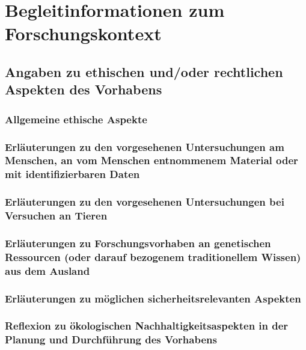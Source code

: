 \documentclass{scrartcl}
\begin{document}
\printbibliography[heading=none]

\clearpage
\renewcommand{\maxpage}{8}
\setcounter{page}{1}

\section{Begleitinformationen zum Forschungskontext}

\subsection{Angaben zu ethischen und/oder rechtlichen Aspekten des Vorhabens}

\subsubsection{Allgemeine ethische Aspekte}

\subsubsection{Erläuterungen zu den vorgesehenen Untersuchungen am Menschen, an vom Menschen entnommenem Material oder mit identifizierbaren Daten}

\subsubsection{Erläuterungen zu den vorgesehenen Untersuchungen bei Versuchen an Tieren}

\subsubsection{Erläuterungen zu Forschungsvorhaben an genetischen Ressourcen (oder darauf bezogenem traditionellem Wissen) aus dem Ausland}

\subsubsection{Erläuterungen zu möglichen sicherheitsrelevanten Aspekten}



\subsubsection{Reflexion zu ökologischen Nachhaltigkeitsaspekten in der Planung und Durchführung des Vorhabens}
\end{document}
